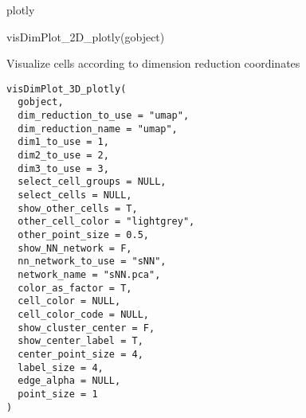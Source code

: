 \documentclass[a4paper]{book}
\begin{document}
%
\begin{Value}
plotly
\end{Value}
%
\begin{Examples}
\begin{ExampleCode}
    visDimPlot_2D_plotly(gobject)
\end{ExampleCode}
\end{Examples}
%
\begin{Description}\relax
Visualize cells according to dimension reduction coordinates
\end{Description}
%
\begin{Usage}
\begin{verbatim}
visDimPlot_3D_plotly(
  gobject,
  dim_reduction_to_use = "umap",
  dim_reduction_name = "umap",
  dim1_to_use = 1,
  dim2_to_use = 2,
  dim3_to_use = 3,
  select_cell_groups = NULL,
  select_cells = NULL,
  show_other_cells = T,
  other_cell_color = "lightgrey",
  other_point_size = 0.5,
  show_NN_network = F,
  nn_network_to_use = "sNN",
  network_name = "sNN.pca",
  color_as_factor = T,
  cell_color = NULL,
  cell_color_code = NULL,
  show_cluster_center = F,
  show_center_label = T,
  center_point_size = 4,
  label_size = 4,
  edge_alpha = NULL,
  point_size = 1
)
\end{verbatim}
\end{Usage}
%
\end{document}
